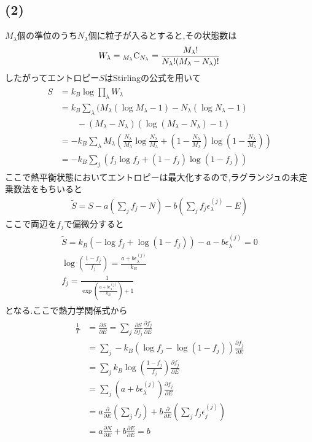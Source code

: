 \subsection*{(2)}
$M_\lambda$個の準位のうち$N_\lambda$個に粒子が入るとすると,その状態数は
\begin{align}
  W_\lambda={}_{M_\lambda}{\rm C}_{N_\lambda}=\frac{M_\lambda!}{N_\lambda!(M_\lambda-N_\lambda)!}
\end{align}
したがってエントロピー$S$はStirlingの公式を用いて
\begin{align}
  \begin{split}
    S&=k_B\log\prod_\lambda W_\lambda\\
    &=k_B\sum_\lambda(M_\lambda(\log M_\lambda-1)-N_\lambda(\log N_\lambda-1)\\
    &\qquad -(M_\lambda-N_\lambda)(\log(M_\lambda-N_\lambda)-1)\\
    &=-k_B\sum_\lambda M_\lambda\left(\frac{N_\lambda}{M_\lambda}\log\frac{N_\lambda}{M_\lambda}+(1-\frac{N_\lambda}{M_\lambda})\log(1-\frac{N_\lambda}{M_\lambda})\right)\\
    &=-k_B\sum_j\left(f_j\log f_j+(1-f_j)\log(1-f_j)\right)
  \end{split}
\end{align}
ここで熱平衡状態においてエントロピーは最大化するので,ラグランジュの未定乗数法をもちいると
\begin{align}
  \tilde{S}=S-a\left(\sum_j f_j-N \right)-b\left(\sum_j f_j\epsilon_\lambda^{(j)}-E\right)
\end{align}
ここで両辺を$f_j$で偏微分すると
\begin{align}
  \begin{split}
    \tilde{S}=k_B\left(-\log f_j+\log(1-f_j)\right)-a-b\epsilon_\lambda^{(j)}=0\\
    \log\left(\frac{1-f_j}{f_j}\right)=\frac{a+b\epsilon_\lambda^{(j)}}{k_B}\\
    f_j=\frac{1}{\exp\left(\frac{a+b\epsilon_\lambda^{(j)}}{k_B}\right)+1}
  \end{split}
\end{align}
となる.ここで熱力学関係式から
\begin{align}
  \begin{split}
    \frac{1}{T}&=\frac{\partial S}{\partial E}=\sum_j\frac{\partial S}{\partial f_j}\frac{\partial f_j}{\partial E}\\
    &=\sum_j-k_B(\log f_j-\log(1-f_j))\frac{\partial f_j}{\partial E}\\
    &=\sum_jk_B\log\left(\frac{1-f_j}{f_j}\right)\frac{\partial f_j}{\partial E}\\
    &=\sum_j(a+b\epsilon_\lambda^{(j)})\frac{\partial f_j}{\partial E}\\
    &=a\frac{\partial}{\partial E}\left(\sum_jf_j\right)+b\frac{\partial}{\partial E}\left(\sum_jf_j\epsilon_j^{(j)}\right)\\
    &=a\frac{\partial N}{\partial E}+b\frac{\partial E}{\partial E}=b
  \end{split}
\end{align}
